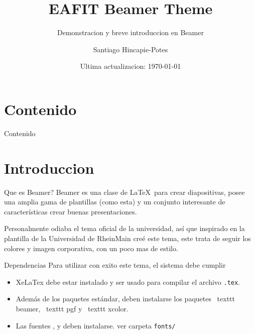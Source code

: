 \documentclass[compress]{beamer}
\title{EAFIT Beamer Theme}
\subtitle{Demonstracion y breve introduccion en Beamer}
\date{Ultima actualizacion: \today}
\author{Santiago Hincapie-Potes}
\institute{Universidad EAFIT}
\begin{document}

\maketitle

\section*{Contenido}
\begin{frame}{Contenido}
	\tableofcontents[hideallsubsections]
\end{frame}

\section{Introduccion}

\begin{frame}{Que es Beamer?}
  Beamer es una clase de \LaTeX\ para crear diapositivas, posee una amplia gama
  de plantillas (como esta) y un conjunto interesante de características crear
  buenas presentaciones.

  Personalmente odiaba el tema oficial de la universidad, así que inspirado en
  la plantilla de la Universidad de RheinMain creé este tema, este trata de
  seguir los colores y imagen corporativa, con un poco mas de estilo.
\end{frame}

\begin{frame}{Dependencias}
	Para utilizar con exito este tema, el sistema debe cumplir
	\begin{itemize}
		\item XeLaTex debe estar instalado y ser usado para compilar el archivo
		\texttt{.tex}.
		\item Además de los paquetes estándar, deben instalarse los paquetes \
		texttt {beamer}, \ texttt {pgf} y \ texttt {xcolor}. 
		\item Las fuentes ,  y
		 deben instalarse. ver carpeta \texttt{fonts/}
	\end{itemize}
\end{frame}
\end{document}
